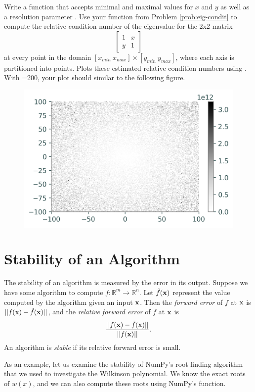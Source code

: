 \begin{problem}\label{prob:plot_eigen}
Write a function that accepts minimal and maximal values for $x$ and $y$ as well as a resolution parameter .
Use your function from Problem \ref{prob:eig-condit} to compute the relative condition number of the eigenvalue for the 2x2 matrix
\[
\left[\begin{array}{cc}
1 &  x\\
y & 1\end{array}\right]
\]
at every point in the domain $[x_{min}\ x_{max}]\times [y_{min}\ y_{max}]$, where each axis is partitioned into  points.
Plots these estimated relative condition numbers using .
With =200, your plot should similar to the following figure.

\begin{figure}[H]
    \includegraphics[width=.7\linewidth]{figures/eigenvalue_conditioning.png}
\end{figure}
\end{problem}

\section*{Stability of an Algorithm} %

The stability of an algorithm is measured by the error in its output.
Suppose we have some algorithm to compute $f: \mathbb{R}^m \rightarrow \mathbb{R}^n$.
Let $\tilde f(\mathbf{x})$ represent the value computed by the algorithm given an input $\mathbf{x}$.
Then the \emph{forward error} of $f$ at $\mathbf{x}$ is $||f(\mathbf{x})-\tilde f(\mathbf{x})||$, and the \emph{relative forward error} of $f$ at $\mathbf{x}$ is
\[
\frac{||f(\mathbf{x})-\tilde f(\mathbf{x})||}{||f(\mathbf{x})||}.
\]
An algorithm is \emph{stable} if its relative forward error is small.

As an example, let us examine the stability of NumPy's root finding algorithm that we used to investigate the Wilkinson polynomial.
We know the exact roots of $w(x)$, and we can also compute these roots using NumPy's  function.

